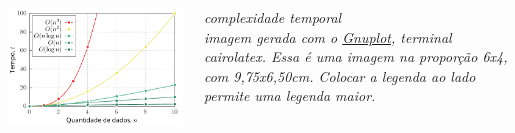 \documentclass[aspectratio=169]{beamer}
\begin{document}
\begin{frame}[t]\frametitle{\secname}\framesubtitle{\subsecname}
  \begin{columns}[T]
    \begin{column}{9.75cm}
      \includegraphics[width=\columnwidth]{images/pdf/complexidade.pdf}%
    \end{column}
    \begin{column}{4.25cm}
      \it\alert{complexidade temporal}\\
      imagem gerada com o \href{http://www.gnuplot.info/}{Gnuplot}, terminal cairolatex.
      Essa é uma imagem na proporção 6x4, com 9,75x6,50cm. Colocar a legenda ao lado permite uma legenda maior.
    \end{column}
  \end{columns}
\end{frame}
\end{document}
